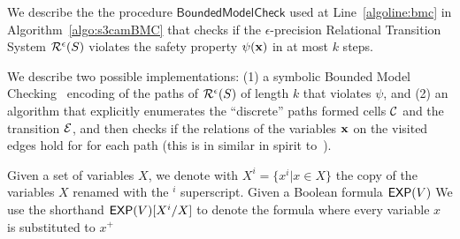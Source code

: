We describe the the procedure $\mathsf{BoundedModelCheck}$ used at
Line~\ref{algoline:bmc} in Algorithm~\ref{algo:s3camBMC}
that checks if the $\epsilon$-precision Relational Transition System
$\mathcal{R}^{\epsilon}(S)$ violates the safety property
$\psi(\mathbf{x})$ in at most $k$ steps.

We describe two possible implementations:
(1) a symbolic Bounded Model Checking~\cite{Biere+Others/99/Symbolic} encoding of
the paths of $\mathcal{R}^{\epsilon}(S)$ of length $k$ that 
violates $\psi$, and (2) an algorithm that explicitly enumerates the
``discrete'' paths formed cells $\mathcal{C}$ and the transition
$\mathcal{E}$, and then checks if the relations of the variables $\mathbf{x}$
on the visited edges hold for for each path (this is in similar in
spirit to~\cite{DBLP:conf/fmcad/BuLWL08}).


\newcommand{\bvars}[1]{\ensuremath{{B}^{#1}}}
\newcommand{\rvars}[1]{\ensuremath{{\vx}^{#1}}}
\newcommand{\vars}[1]{\ensuremath{{V}^{#1}}}
\newcommand{\cellvar}[1]{\ensuremath{{cell}^{#1}}}
\newcommand{\initbmc}{\ensuremath{INIT}}
\newcommand{\encbmc}{\ensuremath{BMC}}
\newcommand{\errorbmc}{\ensuremath{ERROR}}
\newcommand{\transbmc}{\ensuremath{TRANS}}
\newcommand{\edgebmc}{\ensuremath{EDGE}}
\newcommand{\subs}[3]{\ensuremath{{#1}[{#2}/{#3}]}}

Given a set of variables $X$, we denote with $X^i=\{x^i | x \in X\}$
the copy of the variables $X$ renamed with the $^i$ superscript.
Given a Boolean formula $\mathsf{EXP}(V)$
We use the shorthand $\subs{\exprs{V}}{X^i}{X}$ to denote the formula
where every variable $x$ is substituted to $x^+$

